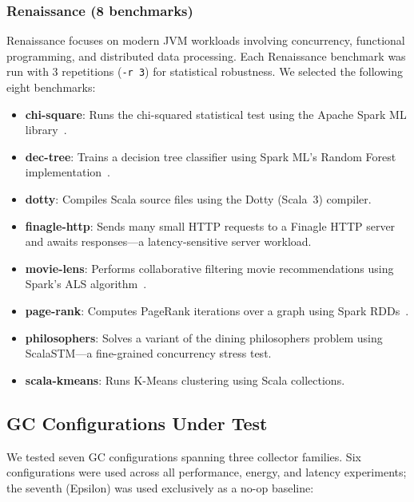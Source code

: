 \subsubsection{Renaissance (8 benchmarks)}

Renaissance focuses on modern JVM workloads involving concurrency, functional programming, and distributed data processing. Each Renaissance benchmark was run with 3 repetitions (\texttt{-r~3}) for statistical robustness. We selected the following eight benchmarks:

\begin{itemize}
\item \textbf{chi-square}: Runs the chi-squared statistical test using the Apache Spark ML library~\cite{zaharia2016spark}.
\item \textbf{dec-tree}: Trains a decision tree classifier using Spark ML's Random Forest implementation~\cite{zaharia2016spark}.
\item \textbf{dotty}: Compiles Scala source files using the Dotty (Scala~3) compiler.
\item \textbf{finagle-http}: Sends many small HTTP requests to a Finagle HTTP server and awaits responses---a latency-sensitive server workload.
\item \textbf{movie-lens}: Performs collaborative filtering movie recommendations using Spark's ALS algorithm~\cite{zaharia2016spark}.
\item \textbf{page-rank}: Computes PageRank iterations over a graph using Spark RDDs~\cite{zaharia2016spark}.
\item \textbf{philosophers}: Solves a variant of the dining philosophers problem using ScalaSTM---a fine-grained concurrency stress test.
\item \textbf{scala-kmeans}: Runs K-Means clustering using Scala collections.
\end{itemize}

\subsection{GC Configurations Under Test}

We tested seven GC configurations spanning three collector families. Six configurations were used across all performance, energy, and latency experiments; the seventh (Epsilon) was used exclusively as a no-op baseline:

